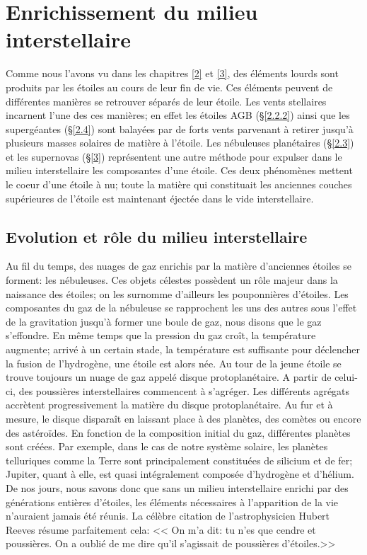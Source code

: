 
\chapterFormatfive

\chapter{Enrichissement du milieu interstellaire}\label{5}

\chapterFormat

Comme nous l'avons vu dans les chapitres \ref{2} et \ref{3}, des éléments lourds sont produits par les étoiles au cours de leur fin de vie. Ces éléments peuvent de différentes manières se retrouver séparés de leur étoile. Les vents stellaires incarnent l'une des ces manières; en effet les étoiles AGB (§\ref{2.2.2}) ainsi que les supergéantes (§\ref{2.4}) sont balayées par de forts vents parvenant à retirer jusqu'à plusieurs masses solaires de matière à l'étoile. Les nébuleuses planétaires (§\ref{2.3}) et les supernovas (§\ref{3}) représentent une autre méthode pour expulser dans le milieu interstellaire les composantes d'une étoile. Ces deux phénomènes mettent le coeur d'une étoile à nu; toute la matière qui constituait les anciennes couches supérieures de l'étoile est maintenant éjectée dans le vide interstellaire. 

\section{Evolution et rôle du milieu interstellaire}\label{5.1}

Au fil du temps, des nuages de gaz enrichis par la matière d'anciennes étoiles se forment: les nébuleuses. Ces objets célestes possèdent un rôle majeur dans la naissance des étoiles; on les surnomme d'ailleurs les pouponnières d'étoiles. Les composantes du gaz de la nébuleuse se rapprochent les uns des autres sous l'effet de la gravitation jusqu'à former une boule de gaz, nous disons que le gaz s'effondre. En même temps que la pression du gaz croît, la température augmente; arrivé à un certain stade, la température est suffisante pour déclencher la fusion de l'hydrogène, une étoile est alors née. Au tour de la jeune étoile se trouve toujours un nuage de gaz appelé disque protoplanétaire. A partir de celui-ci, des poussières interstellaires commencent à s'agréger. Les différents agrégats accrètent progressivement la matière du disque protoplanétaire. Au fur et à mesure, le disque disparaît en laissant place à des planètes, des comètes ou encore des astéroïdes. En fonction de la composition initial du gaz, différentes planètes sont créées. Par exemple, dans le cas de notre système solaire, les planètes telluriques comme la Terre sont principalement constituées de silicium et de fer; Jupiter, quant à elle, est quasi intégralement composée d'hydrogène et d'hélium. De nos jours, nous savons donc que sans un milieu interstellaire enrichi par des générations entières d'étoiles, les éléments nécessaires à l'apparition de la vie n'auraient jamais été réunis. La célèbre citation de l'astrophysicien Hubert Reeves résume parfaitement cela: << On m'a dit: tu n'es que cendre et poussières. On a oublié de me dire qu'il s'agissait de poussières d'étoiles.>>

